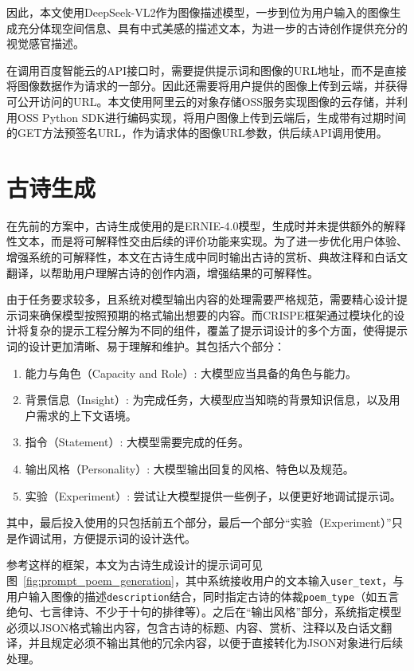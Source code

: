 因此，本文使用DeepSeek-VL2作为图像描述模型，一步到位为用户输入的图像生成充分体现空间信息、具有中式美感的描述文本，为进一步的古诗创作提供充分的视觉感官描述。

在调用百度智能云的API接口时，需要提供提示词和图像的URL地址，而不是直接将图像数据作为请求的一部分。因此还需要将用户提供的图像上传到云端，并获得可公开访问的URL。本文使用阿里云的对象存储OSS服务实现图像的云存储，并利用OSS Python SDK进行编码实现，将用户图像上传到云端后，生成带有过期时间的GET方法预签名URL，作为请求体的图像URL参数，供后续API调用使用。

\section{古诗生成} \label{sec:poem_generation}

在先前的方案中，古诗生成使用的是ERNIE-4.0模型，生成时并未提供额外的解释性文本，而是将可解释性交由后续的评价功能来实现。为了进一步优化用户体验、增强系统的可解释性，本文在古诗生成中同时输出古诗的赏析、典故注释和白话文翻译，以帮助用户理解古诗的创作内涵，增强结果的可解释性。

由于任务要求较多，且系统对模型输出内容的处理需要严格规范，需要精心设计提示词来确保模型按照预期的格式输出想要的内容。而CRISPE框架通过模块化的设计将复杂的提示工程分解为不同的组件，覆盖了提示词设计的多个方面，使得提示词的设计更加清晰、易于理解和维护。其包括六个部分：
\begin{enumerate}
  \item 能力与角色（Capacity and Role）: 大模型应当具备的角色与能力。
  \item 背景信息（Insight）: 为完成任务，大模型应当知晓的背景知识信息，以及用户需求的上下文语境。
  \item 指令（Statement）: 大模型需要完成的任务。
  \item 输出风格（Personality）: 大模型输出回复的风格、特色以及规范。
  \item 实验（Experiment）: 尝试让大模型提供一些例子，以便更好地调试提示词。
\end{enumerate}

其中，最后投入使用的只包括前五个部分，最后一个部分“实验（Experiment）”只是作调试用，方便提示词的设计迭代。

参考这样的框架，本文为古诗生成设计的提示词可见图~\ref{fig:prompt_poem_generation}，其中系统接收用户的文本输入\verb|user_text|，与用户输入图像的描述\verb|description|结合，同时指定古诗的体裁\verb|poem_type|（如五言绝句、七言律诗、不少于十句的排律等）。之后在“输出风格”部分，系统指定模型必须以JSON格式输出内容，包含古诗的标题、内容、赏析、注释以及白话文翻译，并且规定必须不输出其他的冗余内容，以便于直接转化为JSON对象进行后续处理。

